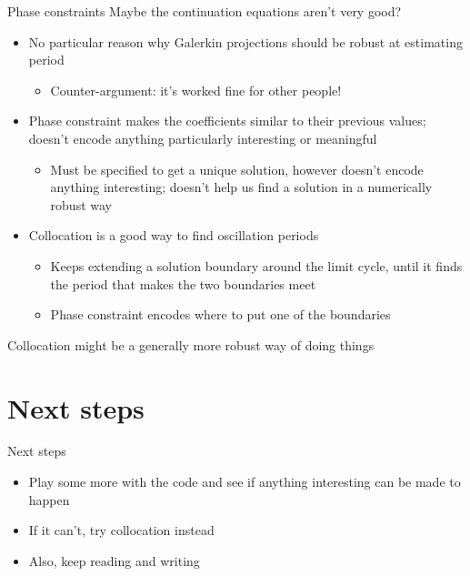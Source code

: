 \documentclass[presentation]{beamer}
\begin{document}
\begin{frame}[label={sec:orgd5d5052}]{Phase constraints}
Maybe the continuation equations aren't very good?
\begin{itemize}
\item No particular reason why Galerkin projections should be robust at estimating period
\begin{itemize}
\item Counter-argument: it's worked fine for other people!
\end{itemize}
\item Phase constraint makes the coefficients similar to their previous values; doesn't encode anything particularly interesting or meaningful
\begin{itemize}
\item Must be specified to get a unique solution, however doesn't encode anything interesting; doesn't help us find a solution in a numerically robust way
\end{itemize}
\end{itemize}
\vfill
\begin{itemize}
\item Collocation is a good way to find oscillation periods
\begin{itemize}
\item Keeps extending a solution boundary around the limit cycle, until it finds the period that makes the two boundaries meet
\item Phase constraint encodes where to put one of the boundaries
\end{itemize}
\end{itemize}
\vfill
Collocation might be a generally more robust way of doing things
\end{frame}

\section{Next steps}
\label{sec:org5260373}
\begin{frame}[label={sec:org5f4b524}]{Next steps}
\begin{itemize}
\item Play some more with the code and see if anything interesting can be made to happen
\item If it can't, try collocation instead
\item Also, keep reading and writing
\end{itemize}
\end{frame}
\end{document}
